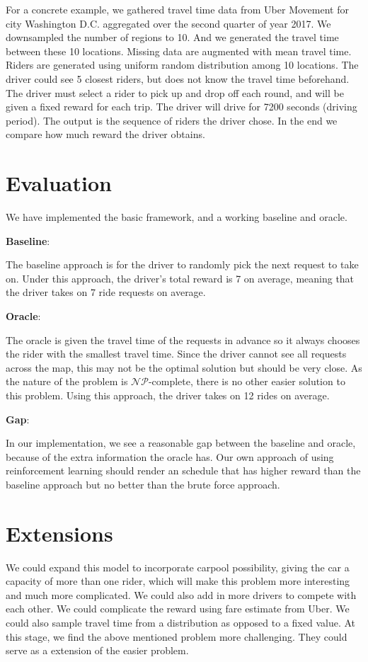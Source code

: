 \documentclass{article}
\begin{document}
For a concrete example, we gathered travel time data from Uber Movement for city Washington D.C. aggregated over the second quarter of year 2017. We downsampled the number of regions to 10. And we generated the travel time between these 10 locations. Missing data are augmented with mean travel time. Riders are generated using uniform random distribution among 10 locations. The driver could see 5 closest riders, but does not know the travel time beforehand. The driver must select a rider to pick up and drop off each round, and will be given a fixed reward for each trip. The driver will drive for 7200 seconds (driving period). The output is the sequence of riders the driver chose. In the end we compare how much reward the driver obtains.

\section{Evaluation}
We have implemented the basic framework, and a working baseline and oracle.

\noindent\textbf{Baseline}:

The baseline approach is for the driver to randomly pick the next request to take on. Under this approach, the driver's total reward is 7 on average, meaning that the driver takes on 7 ride requests on average.

\noindent\textbf{Oracle}:

The oracle is given the travel time of the requests in advance so it always chooses the rider with the smallest travel time. Since the driver cannot see all requests across the map, this may not be the optimal solution but should be very close. As the nature of the problem is $\mathcal{NP}$-complete, there is no other easier solution to this problem. Using this approach, the driver takes on 12 rides on average.

\noindent\textbf{Gap}:

In our implementation, we see a reasonable gap between the baseline and oracle, because of the extra information the oracle has. Our own approach of using reinforcement learning should render an schedule that has higher reward than the baseline approach but no better than the brute force approach. 

\section{Extensions}

We could expand this model to incorporate carpool possibility, giving the car a capacity of more than one rider, which will make this problem more interesting and much more complicated. We could also add in more drivers to compete with each other. We could complicate the reward using fare estimate from Uber. We could also sample travel time from a distribution as opposed to a fixed value. At this stage, we find the above mentioned problem more challenging. They could serve as a extension of the easier problem.
\end{document}
